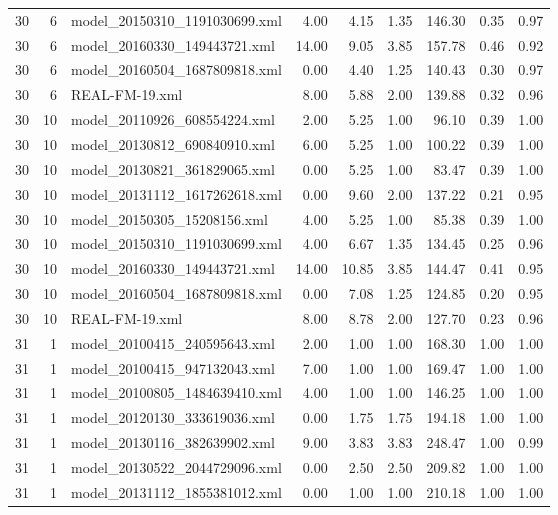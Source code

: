 \begin{table}[ht]
\begin{tabular}{rrlrrrrrr}
   30 &   6 & model\_20150310\_1191030699.xml & 4.00 & 4.15 & 1.35 & 146.30 & 0.35 & 0.97 \\ 
   30 &   6 & model\_20160330\_149443721.xml & 14.00 & 9.05 & 3.85 & 157.78 & 0.46 & 0.92 \\ 
   30 &   6 & model\_20160504\_1687809818.xml & 0.00 & 4.40 & 1.25 & 140.43 & 0.30 & 0.97 \\ 
   30 &   6 & REAL-FM-19.xml & 8.00 & 5.88 & 2.00 & 139.88 & 0.32 & 0.96 \\ 
   30 &  10 & model\_20110926\_608554224.xml & 2.00 & 5.25 & 1.00 & 96.10 & 0.39 & 1.00 \\ 
   30 &  10 & model\_20130812\_690840910.xml & 6.00 & 5.25 & 1.00 & 100.22 & 0.39 & 1.00 \\ 
   30 &  10 & model\_20130821\_361829065.xml & 0.00 & 5.25 & 1.00 & 83.47 & 0.39 & 1.00 \\ 
   30 &  10 & model\_20131112\_1617262618.xml & 0.00 & 9.60 & 2.00 & 137.22 & 0.21 & 0.95 \\ 
   30 &  10 & model\_20150305\_15208156.xml & 4.00 & 5.25 & 1.00 & 85.38 & 0.39 & 1.00 \\ 
   30 &  10 & model\_20150310\_1191030699.xml & 4.00 & 6.67 & 1.35 & 134.45 & 0.25 & 0.96 \\ 
   30 &  10 & model\_20160330\_149443721.xml & 14.00 & 10.85 & 3.85 & 144.47 & 0.41 & 0.95 \\ 
   30 &  10 & model\_20160504\_1687809818.xml & 0.00 & 7.08 & 1.25 & 124.85 & 0.20 & 0.95 \\ 
   30 &  10 & REAL-FM-19.xml & 8.00 & 8.78 & 2.00 & 127.70 & 0.23 & 0.96 \\ 
   31 &   1 & model\_20100415\_240595643.xml & 2.00 & 1.00 & 1.00 & 168.30 & 1.00 & 1.00 \\ 
   31 &   1 & model\_20100415\_947132043.xml & 7.00 & 1.00 & 1.00 & 169.47 & 1.00 & 1.00 \\ 
   31 &   1 & model\_20100805\_1484639410.xml & 4.00 & 1.00 & 1.00 & 146.25 & 1.00 & 1.00 \\ 
   31 &   1 & model\_20120130\_333619036.xml & 0.00 & 1.75 & 1.75 & 194.18 & 1.00 & 1.00 \\ 
   31 &   1 & model\_20130116\_382639902.xml & 9.00 & 3.83 & 3.83 & 248.47 & 1.00 & 0.99 \\ 
   31 &   1 & model\_20130522\_2044729096.xml & 0.00 & 2.50 & 2.50 & 209.82 & 1.00 & 1.00 \\ 
   31 &   1 & model\_20131112\_1855381012.xml & 0.00 & 1.00 & 1.00 & 210.18 & 1.00 & 1.00 \\ 

\end{tabular}
\end{table}
